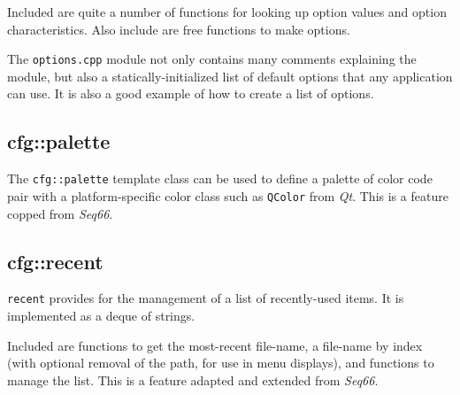    Included are quite a number of functions for looking up option values
   and option characteristics.
   Also include are free functions to make options.

   The \texttt{options.cpp} module not only contains many comments explaining
   the module, but also a statically-initialized list of
   default options that any application can use.
   It is also a good example of how to create a list of options.

\subsection{cfg::palette}
\label{subsec:cfg_namespace_}

   The \texttt{cfg::palette} template class can be used to define
   a palette of color code pair with a platform-specific color class
   such as \texttt{QColor} from \textsl{Qt}.
   This is a feature copped from \textsl{Seq66}.

\subsection{cfg::recent}
\label{subsec:cfg_namespace_recent}

   \texttt{recent} provides for the management of a list of recently-used
   items. It is implemented as a deque of strings.

   Included are functions to get the most-recent file-name, a file-name by
   index (with optional removal of the path, for use in menu displays),
   and functions to manage the list.
   This is a feature adapted and extended from \textsl{Seq66}.

